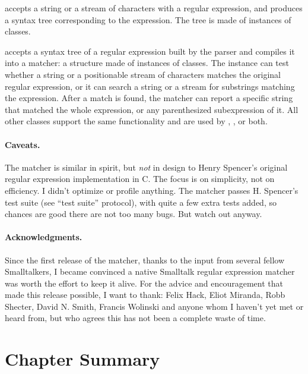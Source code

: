 \documentclass[a4paper,10pt,twoside]{book}
\begin{document}
{ accepts a string or a stream of characters with a regular expression, and produces a syntax tree corresponding to the expression. The tree is made of instances of  classes.

  accepts a syntax tree of a regular expression built by the parser and compiles it into a matcher: a structure made of instances of  classes. The  instance can test whether a string or a positionable stream of characters matches the original regular expression, or it can search a string or a stream for substrings matching the expression. After a match is found, the matcher can report a specific string that matched the whole expression, or any parenthesized subexpression of it. All other classes support the same functionality and are used by , , or both.

\paragraph{Caveats.} The matcher is similar in spirit, but \emph{not} in design
to Henry Spencer's original regular expression implementation in C.  The focus is on simplicity, not on efficiency. I didn't optimize or profile anything.
The matcher passes H. Spencer's test suite (see ``test suite'' protocol), with quite a few extra tests added, so chances are good there are not too many bugs.  But watch out anyway.

\paragraph{Acknowledgments.}
Since the first release of the matcher, thanks to the input from several fellow Smalltalkers, I became convinced a native Smalltalk regular expression matcher was worth the effort to keep it alive. For the advice and encouragement that made this release possible, I want to thank: Felix Hack, Eliot Miranda, Robb Shecter, David N. Smith, Francis Wolinski and anyone whom I haven't yet met or heard from, but who agrees this has not been a complete waste of time.

\section{Chapter Summary}

}
\end{document}
